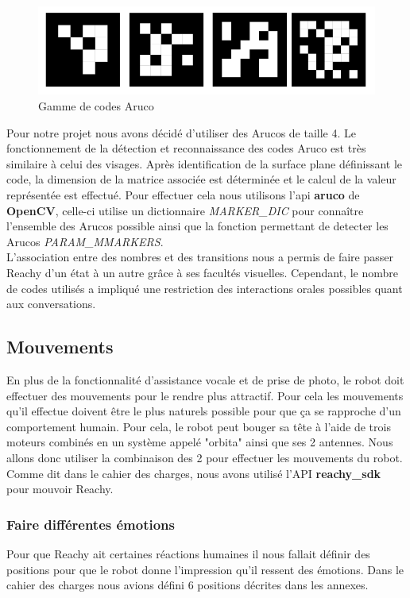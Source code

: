 \documentclass[a4paper,french]{article}
\begin{document}
\begin{figure}[H]
    \centering
    \includegraphics[scale=0.6]{figures/Aruco.png}
    \caption{Gamme de codes Aruco}
    \label{fig:Aruco}
\end{figure}

Pour notre projet nous avons décidé d'utiliser des Arucos de taille 4. Le fonctionnement de la détection et reconnaissance des codes Aruco est très similaire à celui des visages. Après identification de la surface plane définissant le code, la dimension de la matrice associée est déterminée et le calcul de la valeur représentée est effectué. Pour effectuer cela nous utilisons l'api \textbf{aruco} de \textbf{OpenCV}, celle-ci utilise un dictionnaire \textit{MARKER\_DIC} pour connaître l'ensemble des Arucos possible ainsi que la fonction permettant de detecter les Arucos \textit{PARAM\_MMARKERS}.\\
L'association entre des nombres et des transitions nous a permis de faire passer Reachy d'un état à un autre grâce à ses facultés visuelles. Cependant, le nombre de codes utilisés a impliqué une restriction des interactions orales possibles quant aux conversations.\\

\subsection{Mouvements}
En plus de la fonctionnalité d'assistance vocale et de prise de photo, le robot doit effectuer des mouvements pour le rendre plus attractif. Pour cela les mouvements qu'il effectue doivent être le plus naturels possible pour que ça se rapproche d'un comportement humain. Pour cela, le robot peut bouger sa tête à l'aide de trois moteurs combinés en un système appelé "orbita" ainsi que ses 2 antennes. Nous allons donc utiliser la combinaison des 2 pour effectuer les mouvements du robot. Comme dit dans le cahier des charges, nous avons utilisé l'API \textbf{reachy\_sdk} pour mouvoir Reachy.

\subsubsection{Faire différentes émotions}
Pour que Reachy ait certaines réactions humaines il nous fallait définir des positions pour que le robot donne l'impression qu'il ressent des émotions. Dans le cahier des charges nous avions défini 6 positions décrites dans les annexes.\\
\end{document}
